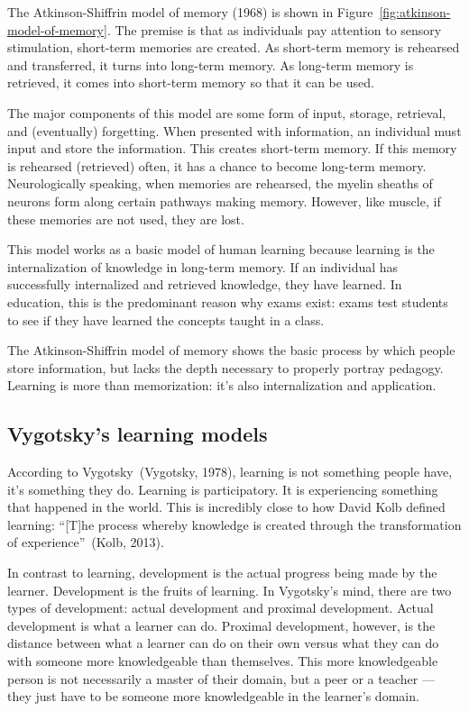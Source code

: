 The Atkinson-Shiffrin model of memory (1968) is shown in Figure~\ref{fig:atkinson-model-of-memory}. The premise is that as individuals pay attention to sensory stimulation, short-term memories are created. As short-term memory is rehearsed and transferred, it turns into long-term memory. As long-term memory is retrieved, it comes into short-term memory so that it can be used.

The major components of this model are some form of input, storage, retrieval, and (eventually) forgetting. When presented with information, an individual must input and store the information. This creates short-term memory. If this memory is rehearsed (retrieved) often, it has a chance to become long-term memory. Neurologically speaking, when memories are rehearsed, the myelin sheaths of neurons form along certain pathways making memory. However, like muscle, if these memories are not used, they are lost.

This model works as a basic model of human learning because learning is the internalization of knowledge in long-term memory. If an individual has successfully internalized and retrieved knowledge, they have learned. In education, this is the predominant reason why exams exist: exams test students to see if they have learned the concepts taught in a class.

The Atkinson-Shiffrin model of memory shows the basic process by which people store information, but lacks the depth necessary to properly portray pedagogy. Learning is more than memorization: it's also internalization and application.

\subsection{Vygotsky's learning models}
According to Vygotsky~(Vygotsky, 1978), learning is not something people have, it's something they do. Learning is participatory. It is experiencing something that happened in the world. This is incredibly close to how David Kolb defined learning: ``[T]he process whereby knowledge is created through the transformation of experience''~(Kolb, 2013).

In contrast to learning, development is the actual progress being made by the learner. Development is the fruits of learning. In Vygotsky's mind, there are two types of development: actual development and proximal development. Actual development is what a learner can do. Proximal development, however, is the distance between what a learner can do on their own versus what they can do with someone more knowledgeable than themselves. This more knowledgeable person is not necessarily a master of their domain, but a peer or a teacher — they just have to be someone more knowledgeable in the learner's domain.

